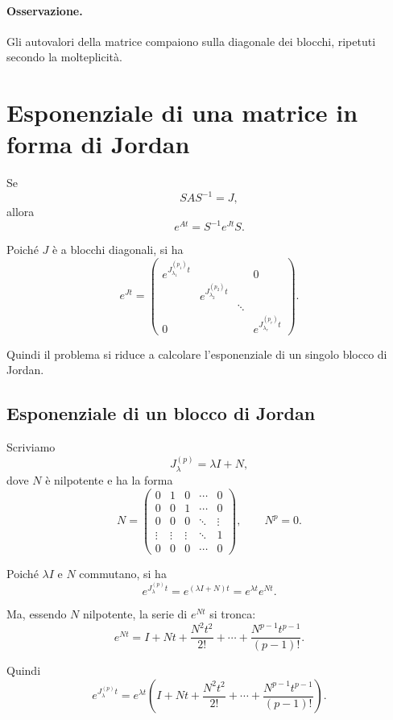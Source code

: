 \paragraph{Osservazione.}
Gli autovalori della matrice compaiono sulla diagonale dei blocchi, ripetuti secondo la molteplicità.

\section{Esponenziale di una matrice in forma di Jordan}

Se
\[
SAS^{-1}=J,
\]
allora
\[
e^{At}=S^{-1}e^{Jt}S.
\]

Poiché $J$ è a blocchi diagonali, si ha
\begin{equation}
e^{Jt}=
\begin{pmatrix}
e^{J_{\lambda_1}^{(p_1)}t} & & & 0\\
& e^{J_{\lambda_2}^{(p_2)}t} & & \\
& & \ddots & \\
0 & & & e^{J_{\lambda_r}^{(p_r)}t}
\end{pmatrix}.
\label{eq:L5_exp_Jordan_blocks}
\end{equation}

Quindi il problema si riduce a calcolare l'esponenziale di un singolo blocco di Jordan.

\subsection{Esponenziale di un blocco di Jordan}

Scriviamo
\[
J_\lambda^{(p)}=\lambda I + N,
\]
dove $N$ è nilpotente e ha la forma
\[
N=
\begin{pmatrix}
0 & 1 & 0 & \cdots & 0\\
0 & 0 & 1 & \cdots & 0\\
0 & 0 & 0 & \ddots & \vdots\\
\vdots & \vdots & \vdots & \ddots & 1\\
0 & 0 & 0 & \cdots & 0
\end{pmatrix},
\qquad
N^p=0.
\]

Poiché $\lambda I$ e $N$ commutano, si ha
\[
e^{J_\lambda^{(p)}t}
=
e^{(\lambda I+N)t}
=
e^{\lambda t}e^{Nt}.
\]

Ma, essendo $N$ nilpotente, la serie di $e^{Nt}$ si tronca:
\[
e^{Nt}=
I+Nt+\frac{N^2t^2}{2!}+\cdots+\frac{N^{p-1}t^{p-1}}{(p-1)!}.
\]

Quindi
\begin{equation}
e^{J_\lambda^{(p)}t}
=
e^{\lambda t}
\left(
I+Nt+\frac{N^2t^2}{2!}+\cdots+\frac{N^{p-1}t^{p-1}}{(p-1)!}
\right).
\label{eq:L5_exp_Jordan_block_compact}
\end{equation}

